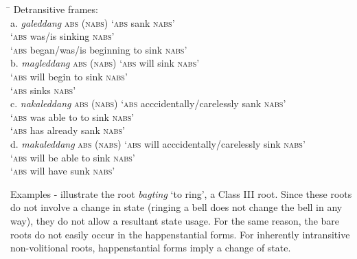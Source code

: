 \z
\ea
\label{bkm:Ref148516783}
\begin{tabbing}
\hspace{4.5cm} \= \kill
Detransitive frames: \\
a.  \textit{galeddang} \textsc{abs} (\textsc{nabs}) \> ‘\textsc{abs} sank \textsc{nabs}’ \\
\>       ‘\textsc{abs} was/is sinking \textsc{nabs}’ \\
\>       ‘\textsc{abs} began/was/is beginning to sink \textsc{nabs}’ \\
b.  \textit{magleddang} \textsc{abs} (\textsc{nabs}) \> ‘\textsc{abs} will sink \textsc{nabs}’ \\
\>       ‘\textsc{abs} will begin to sink \textsc{nabs}’ \\
\>      ‘\textsc{abs} sinks \textsc{nabs}’ \\
c.  \textit{nakaleddang} \textsc{abs} (\textsc{nabs}) \> ‘\textsc{abs} acccidentally/carelessly sank \textsc{nabs}’ \\
\>      ‘\textsc{abs} was able to to sink \textsc{nabs}’ \\
\>      ‘\textsc{abs} has already sank \textsc{nabs}’ \\
d.  \textit{makaleddang} \textsc{abs} (\textsc{nabs}) \> ‘\textsc{abs} will acccidentally/carelessly sink \textsc{nabs}’ \\
\>      ‘\textsc{abs} will be able to sink \textsc{nabs}’ \\
\>      ‘\textsc{abs} will have sunk \textsc{nabs}’
\end{tabbing}
\z

Examples - illustrate the root \textit{bagting} ‘to ring’, a Class III root. Since these roots do not involve a change in state (ringing a bell does not change the bell in any way), they do not allow a resultant state usage. For the same reason, the bare roots do not easily occur in the happenstantial forms. For inherently intransitive non-volitional roots, happenstantial forms imply a change of state.

